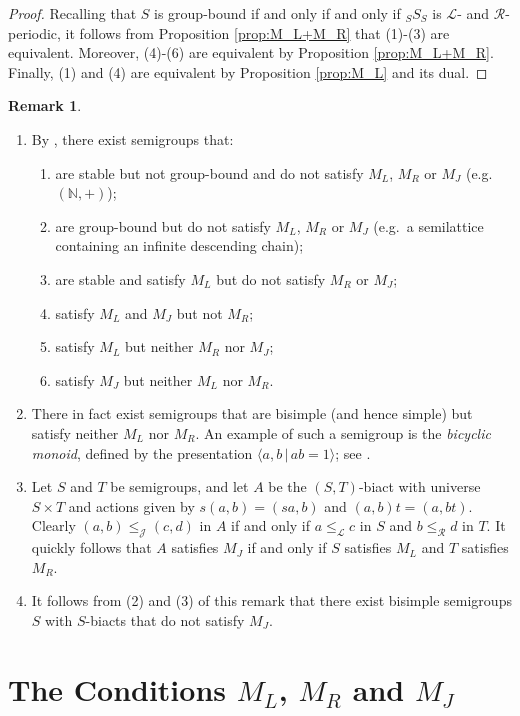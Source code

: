 \documentclass[twoside,a4paper,12pt,reqno]{amsart}
\theoremstyle{plain}
\theoremstyle{definition}
\newtheorem{rem}[thm]{Remark}
\renewcommand{\l}{\mbox{${\mathcal{L}}$}}
\renewcommand{\r}{\mbox{${\mathcal{R}}$}}
\newcommand{\leql}{\leq_{\mathcal{L}}}
\newcommand{\leqr}{\leq_{\mathcal{R}}}
\newcommand{\leqj}{\leq_{\mathcal{J}}}
\newcommand{\N}{\mathbb{N}}
\begin{document}
\begin{proof}
Recalling that $S$ is group-bound if and only if and only if ${_S}S_S$ is $\l$- and $\r$-periodic, it follows from Proposition \ref{prop:M_L+M_R} that (1)-(3) are equivalent.  Moreover, (4)-(6) are equivalent by Proposition \ref{prop:M_L+M_R}.  Finally, (1) and (4) are equivalent by Proposition \ref{prop:M_L} and its dual.
\end{proof}

\vspace{0.1em}
\begin{rem}~
\begin{enumerate}[leftmargin=*]
\item By \cite{Hall}, there exist semigroups that: 
\begin{enumerate}
\item are stable but not group-bound and do not satisfy $M_L$, $M_R$ or $M_J$ (e.g.\ $(\N,+)$);
\item are group-bound but do not satisfy $M_L$, $M_R$ or $M_J$ (e.g.\ a semilattice containing an infinite descending chain);
\item are stable and satisfy $M_L$ but do not satisfy $M_R$ or $M_J$;
\item satisfy $M_L$ and $M_J$ but not $M_R$;
\item satisfy $M_L$ but neither $M_R$ nor $M_J$;
\item satisfy $M_J$ but neither $M_L$ nor $M_R$.
\end{enumerate}
\item There in fact exist semigroups that are bisimple (and hence simple) but satisfy neither $M_L$ nor $M_R$.  An example of such a semigroup is the {\em bicyclic monoid}, defined by the presentation $\langle a,b\,|\,ab=1\rangle$; see \cite[Section 2.1, Exercise 6]{Clifford:1961}.  
\item Let $S$ and $T$ be semigroups, and let $A$ be the $(S,T)$-biact with universe $S\times T$ and actions given by $s(a,b)=(sa,b)$ and $(a,b)t=(a,bt).$  Clearly $(a,b)\leqj(c,d)$ in $A$ if and only if $a\leql c$ in $S$ and $b\leqr d$ in $T.$  It quickly follows that $A$ satisfies $M_J$ if and only if $S$ satisfies $M_L$ and $T$ satisfies $M_R$.
\item It follows from (2) and (3) of this remark that there exist bisimple semigroups $S$ with $S$-biacts that do not satisfy $M_J$.
\end{enumerate}
\end{rem}

\section{The Conditions $M_L$, $M_R$ and $M_J$}\label{sec:M_K}
\end{document}

